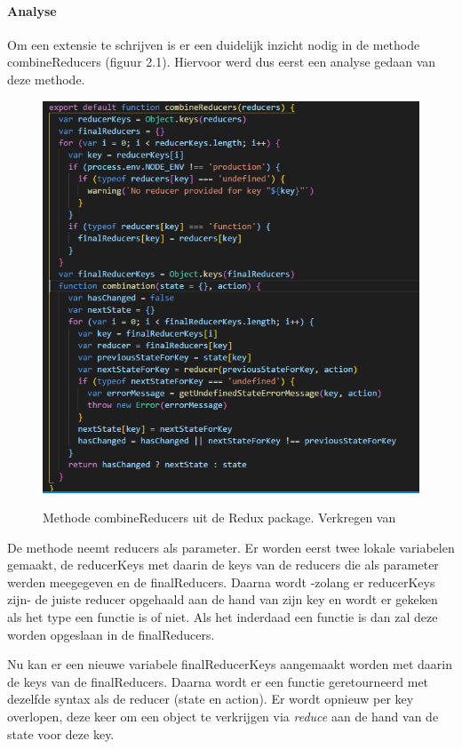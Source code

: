 \paragraph{Analyse}
Om een extensie te schrijven is er een duidelijk inzicht nodig in de methode combineReducers (figuur 2.1). Hiervoor werd dus eerst een analyse gedaan van deze methode.
\begin{figure}
	\begin{center}
		\caption{Methode combineReducers uit de Redux package. Verkregen van \textcite{Redux01}}
		\includegraphics[width=14cm]{img/combineReducers}\\[0.5cm]
	\end{center}
\end{figure} 

De methode neemt reducers als parameter. Er worden eerst twee lokale variabelen gemaakt, de reducerKeys met daarin de keys van de reducers die als parameter werden meegegeven en de finalReducers. Daarna wordt -zolang er reducerKeys zijn- de juiste reducer opgehaald aan de hand van zijn key en wordt er gekeken als het type een functie is of niet. Als het inderdaad een functie is dan zal deze worden opgeslaan in de finalReducers.

Nu kan er een nieuwe variabele finalReducerKeys aangemaakt worden met daarin de keys van de finalReducers. Daarna wordt er een functie geretourneerd met dezelfde syntax als de reducer (state en action). Er wordt opnieuw per key overlopen, deze keer om een object te verkrijgen via \textit{reduce} aan de hand van de state voor deze key.

